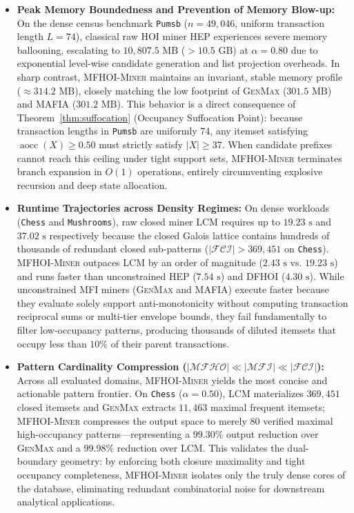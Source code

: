 \documentclass[runningheads,orivec]{llncs}
\newcommand{\aocc}{\operatorname{aocc}}
\newcommand{\MFI}{\ensuremath{\mathcal{MFI}}}
\newcommand{\FCI}{\ensuremath{\mathcal{FCI}}}
\newcommand{\MFHOI}{\ensuremath{\mathcal{MFHO}}}
\newcommand{\MFHOIMiner}{\textsc{MFHOI-Miner}}
\begin{document}
\begin{itemize}
    \item \textbf{Peak Memory Boundedness and Prevention of Memory Blow-up:}
    On the dense census benchmark \texttt{Pumsb} ($n = 49{,}046$, uniform transaction length $L = 74$), classical raw HOI miner \textsc{HEP} experiences severe memory ballooning, escalating to $10{,}807.5\text{ MB}$ ($>10.5\text{ GB}$) at $\alpha = 0.80$ due to exponential level-wise candidate generation and list projection overheads. In sharp contrast, \MFHOIMiner{} maintains an invariant, stable memory profile ($\approx 314.2\text{ MB}$), closely matching the low footprint of \textsc{GenMax} ($301.5\text{ MB}$) and \textsc{MAFIA} ($301.2\text{ MB}$). This behavior is a direct consequence of Theorem~\ref{thm:suffocation} (Occupancy Suffocation Point): because transaction lengths in \texttt{Pumsb} are uniformly 74, any itemset satisfying $\aocc(X) \ge 0.50$ must strictly satisfy $|X| \ge 37$. When candidate prefixes cannot reach this ceiling under tight support sets, \MFHOIMiner{} terminates branch expansion in $O(1)$ operations, entirely circumventing explosive recursion and deep state allocation.

    \item \textbf{Runtime Trajectories across Density Regimes:}
    On dense workloads (\texttt{Chess} and \texttt{Mushrooms}), raw closed miner \textsc{LCM} requires up to $19.23\text{ s}$ and $37.02\text{ s}$ respectively because the closed Galois lattice contains hundreds of thousands of redundant closed sub-patterns ($|\FCI| > 369{,}451$ on \texttt{Chess}). \MFHOIMiner{} outpaces \textsc{LCM} by an order of magnitude ($2.43\text{ s}$ vs. $19.23\text{ s}$) and runs faster than unconstrained \textsc{HEP} ($7.54\text{ s}$) and \textsc{DFHOI} ($4.30\text{ s}$). While unconstrained MFI miners (\textsc{GenMax} and \textsc{MAFIA}) execute faster because they evaluate solely support anti-monotonicity without computing transaction reciprocal sums or multi-tier envelope bounds, they fail fundamentally to filter low-occupancy patterns, producing thousands of diluted itemsets that occupy less than $10\%$ of their parent transactions.

    \item \textbf{Pattern Cardinality Compression ($\vert\MFHOI\vert \ll \vert\MFI\vert \ll \vert\FCI\vert$):}
    Across all evaluated domains, \MFHOIMiner{} yields the most concise and actionable pattern frontier. On \texttt{Chess} ($\alpha=0.50$), \textsc{LCM} materializes $369{,}451$ closed itemsets and \textsc{GenMax} extracts $11{,}463$ maximal frequent itemsets; \MFHOIMiner{} compresses the output space to merely $80$ verified maximal high-occupancy patterns—representing a $99.30\%$ output reduction over \textsc{GenMax} and a $99.98\%$ reduction over \textsc{LCM}. This validates the dual-boundary geometry: by enforcing both closure maximality and tight occupancy completeness, \MFHOIMiner{} isolates only the truly dense cores of the database, eliminating redundant combinatorial noise for downstream analytical applications.
\end{itemize}
\end{document}
